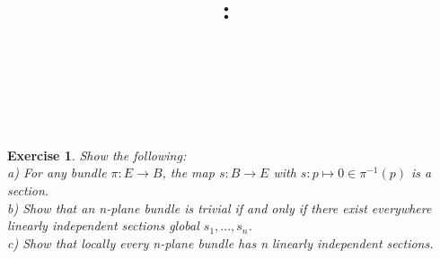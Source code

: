 \documentclass{article}
\title{
    \vspace{2in}
    \textmd{\textbf{\hmwkClass:\ \hmwkTitle}}\\
    \vspace{0.1in}
    \textmd{\hmwkDueDate} \\
    \vspace{0.2in}\large{\textit{\hmwkClassInstructor\  }}
    \vspace{2in}
}
\author{\hmwkAuthorName}
\date{}
\newtheorem{exercise}{Exercise}
\begin{document}
\maketitle

\newpage

\begin{exercise}
  Show the following: \\
  a) For any bundle $\pi: E \to B$, the map $s:B \to E$ with $s: p \mapsto 0 \in \pi^{-1}(p)$ is a section. \\
  b) Show that an n-plane bundle is trivial if and only if there exist everywhere linearly independent sections global $s_{1},...,s_{n}$.\\
  c) Show that locally every n-plane bundle has n linearly independent sections.
\end{exercise}
\end{document}
